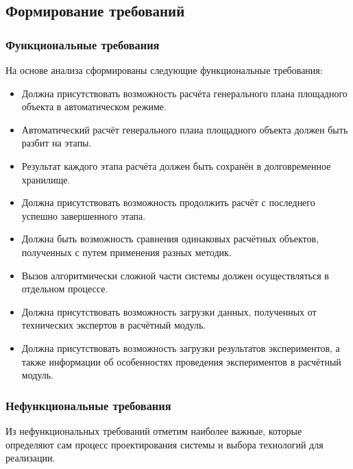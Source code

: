 \subsection{\Large{Формирование требований}}

\subsubsection{\large{Функциональные требования}}

На основе анализа сформированы следующие функциональные требования:
\begin{itemize}
    \item {
        Должна присутствовать возможность расчёта генерального плана площадного объекта в автоматическом режиме.
    }
    \item {
        Автоматический расчёт генерального плана площадного объекта должен быть разбит на этапы.
    }
    \item {
        Результат каждого этапа расчёта должен быть сохранён в долговременное хранилище.
    }
    \item {
        Должна присутствовать возможность продолжить расчёт с последнего успешно завершенного этапа.
    }
    \item {
        Должна быть возможность сравнения одинаковых расчётных объектов, полученных с путем применения разных методик.
    }
    \item {
        Вызов алгоритмически сложной части системы должен осуществляться в отдельном процессе.
    }
    \item {
        Должна присутствовать возможность загрузки данных, полученных от технических экспертов в расчётный модуль.
    }
    \item {
        Должна присутствовать возможность загрузки результатов экспериментов, а также информации об особенностях
        проведения экспериментов в расчётный модуль.
    }
\end{itemize}

\subsubsection{\large{Нефункциональные требования}}

Из нефункциональных требований отметим наиболее важные, которые определяют сам процесс проектирования системы
и выбора технологий для реализации.

